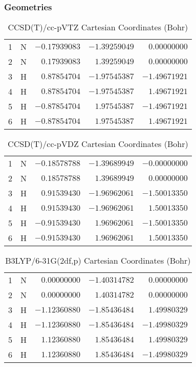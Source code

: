 \documentclass[10pt,oneside]{article}
\begin{document}
\subsubsection*{Geometries}
\begin{table}[h!]
\centering
\caption{CCSD(T)/cc-pVTZ Cartesian Coordinates (Bohr)}
\begin{tabular}{llrrr}
1  & N  & $-0.17939083$ & $-1.39259049$ & $ 0.00000000$ \\
2  & N  & $ 0.17939083$ & $ 1.39259049$ & $ 0.00000000$ \\
3  & H  & $ 0.87854704$ & $-1.97545387$ & $-1.49671921$ \\
4  & H  & $ 0.87854704$ & $-1.97545387$ & $ 1.49671921$ \\
5  & H  & $-0.87854704$ & $ 1.97545387$ & $-1.49671921$ \\
6  & H  & $-0.87854704$ & $ 1.97545387$ & $ 1.49671921$ \\
\end{tabular}
\end{table}

\begin{table}[h!]
\centering
\caption{CCSD(T)/cc-pVDZ Cartesian Coordinates (Bohr)}
\begin{tabular}{llrrr}
1  & N  & $-0.18578788$ & $-1.39689949$ & $-0.00000000$ \\
2  & N  & $ 0.18578788$ & $ 1.39689949$ & $ 0.00000000$ \\
3  & H  & $ 0.91539430$ & $-1.96962061$ & $-1.50013350$ \\
4  & H  & $ 0.91539430$ & $-1.96962061$ & $ 1.50013350$ \\
5  & H  & $-0.91539430$ & $ 1.96962061$ & $-1.50013350$ \\
6  & H  & $-0.91539430$ & $ 1.96962061$ & $ 1.50013350$ \\
\end{tabular}
\end{table}

\begin{table}[h!]
\centering
\caption{B3LYP/6-31G(2df,p) Cartesian Coordinates (Bohr)}
\begin{tabular}{llrrr}
1  & N  & $ 0.00000000$ & $-1.40314782$ & $ 0.00000000$ \\
2  & N  & $ 0.00000000$ & $ 1.40314782$ & $ 0.00000000$ \\
3  & H  & $-1.12360880$ & $-1.85436484$ & $ 1.49980329$ \\
4  & H  & $-1.12360880$ & $-1.85436484$ & $-1.49980329$ \\
5  & H  & $ 1.12360880$ & $ 1.85436484$ & $ 1.49980329$ \\
6  & H  & $ 1.12360880$ & $ 1.85436484$ & $-1.49980329$ \\
\end{tabular}
\end{table}
\end{document}
